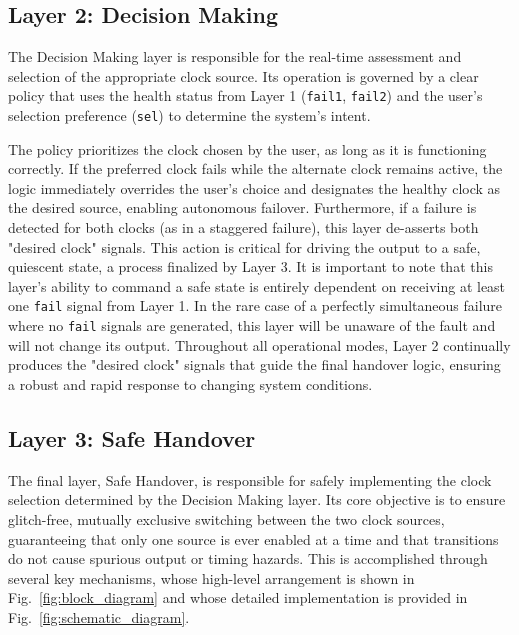 \documentclass[conference]{IEEEtran}
\begin{document}
\subsection{Layer 2: Decision Making}

The Decision Making layer is responsible for the real-time assessment and selection of the appropriate clock source. Its operation is governed by a clear policy that uses the health status from Layer 1 (\texttt{fail1}, \texttt{fail2}) and the user's selection preference (\texttt{sel}) to determine the system's intent.

The policy prioritizes the clock chosen by the user, as long as it is functioning correctly. If the preferred clock fails while the alternate clock remains active, the logic immediately overrides the user's choice and designates the healthy clock as the desired source, enabling autonomous failover. Furthermore, if a failure is detected for both clocks (as in a staggered failure), this layer de-asserts both "desired clock" signals. This action is critical for driving the output to a safe, quiescent state, a process finalized by Layer 3. It is important to note that this layer's ability to command a safe state is entirely dependent on receiving at least one \texttt{fail} signal from Layer 1. In the rare case of a perfectly simultaneous failure where no \texttt{fail} signals are generated, this layer will be unaware of the fault and will not change its output. Throughout all operational modes, Layer 2 continually produces the "desired clock" signals that guide the final handover logic, ensuring a robust and rapid response to changing system conditions.







\subsection{Layer 3: Safe Handover}

The final layer, Safe Handover, is responsible for safely implementing the clock selection determined by the Decision Making layer. Its core objective is to ensure glitch-free, mutually exclusive switching between the two clock sources, guaranteeing that only one source is ever enabled at a time and that transitions do not cause spurious output or timing hazards. This is accomplished through several key mechanisms, whose high-level arrangement is shown in Fig.~\ref{fig:block_diagram} and whose detailed implementation is provided in Fig.~\ref{fig:schematic_diagram}.
\end{document}
